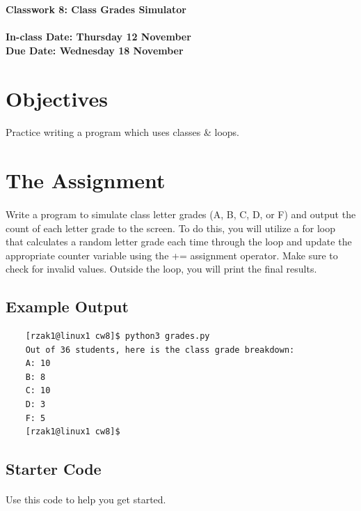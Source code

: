 \documentclass[letter,10pt]{article}
\begin{document}
    
    \huge
    \textbf{Classwork 8: Class Grades Simulator}
    \normalsize
    \\ ~~ \\
    \textbf{In-class Date: Thursday 12 November} \\
    \textbf{Due Date: Wednesday 18 November}
    
    \section*{Objectives}
    \paragraph{}Practice writing a program which uses classes \& loops.
    
    \section*{The Assignment}
    \paragraph{}Write a program to simulate class letter grades (A, B, C, D, or F) and output the count of each letter grade to the screen. To do this, you will utilize a for loop that calculates a random letter grade each time through the loop and update the appropriate counter variable using the += assignment operator. Make sure to check for invalid values. Outside the loop, you will print the final results.
    
    \subsection*{Example Output}
    \begin{verbatim}
    [rzak1@linux1 cw8]$ python3 grades.py
    Out of 36 students, here is the class grade breakdown:
    A: 10
    B: 8
    C: 10
    D: 3
    F: 5
    [rzak1@linux1 cw8]$ 
    \end{verbatim}
    
    \subsection*{Starter Code}
    \paragraph{}Use this code to help you get started.
    
\end{document}
